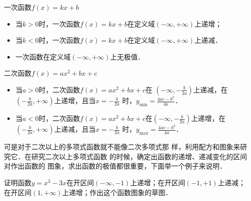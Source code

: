 一次函数$f(x)=kx+b$
\begin{itemize}
    \item 当$k>0$时，一次函数$f(x)=kx+b$在定义域$(-\infty,+\infty)$上递增；
\item 当$k<0$时，一次函数$f(x)=kx+b$在定义域$(-\infty,+\infty)$上递减．
\item 一次函数在定义域$(-\infty,+\infty)$上无极值．
\end{itemize}

二次函数$f(x)=ax^2+bx+c$
\begin{itemize}
    \item 当$a>0$时，二次函数$f(x)=ax^2+bx+c$在
$\left(-\infty,-\frac{b}{2a}\right)$上递减，在$\left(-\frac{b}{2a},+\infty\right)$上递增，且当$x=-\frac{b}{2a}$
时，$y_{\min}=\frac{4ac-b^2}{4a}$．
\item 当$a<0$时，二次函数$f(x)=ax^2+bx+c$在$\left(-\infty,-\frac{b}{2a}\right)$上递增，在$\left(-\frac{b}{2a},+\infty\right)$上递减，且当$x=-\frac{b}{2a}$
时，$y_{\max}=\frac{4ac-b^2}{4a}$．
\end{itemize}


可是对于二次以上的多项式函数就不能像二次多项式那
样，利用配方和图象来研究它．在研究二次以上多项式函数
的时候，确定出函数的递增、递减变化的区间对作出函数的
图象，求出函数的极值都很重要，下面举一个例子来说明．

\begin{example}
证明函数$y=x^3-3x$在开区间$(-\infty,-1)$上递增；在开区间$(-1,+1)$上递减；
在开区间$(1,+\infty)$上递增；作出这个函数图象的草图．
\end{example}

